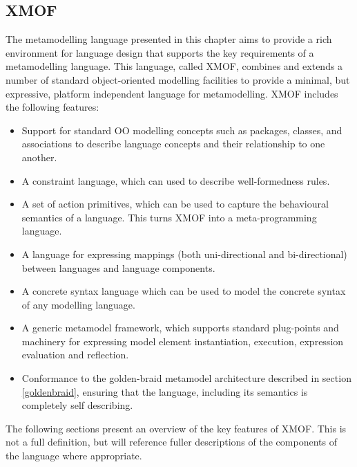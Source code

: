 \subsection{XMOF}

The metamodelling language presented in this chapter aims to
provide a rich environment for language design that supports the
key requirements of a metamodelling language. This language,
called XMOF, combines and extends a number of standard
object-oriented modelling facilities to provide a minimal, but
expressive, platform independent language for metamodelling. XMOF
includes the following features:

\begin{itemize}

\item Support for standard OO modelling concepts such as packages, classes, and
associations to describe language concepts and their relationship to one another.

\item A constraint language, which can used to describe well-formedness rules.

\item A set of action primitives, which can be used to capture the behavioural
semantics of a language. This turns XMOF into a meta-programming
language.

\item A language for expressing mappings (both uni-directional and bi-directional)
between languages and language components.

\item A concrete syntax language which can be used to model the concrete syntax of
any modelling language.

\item A generic metamodel framework, which supports standard plug-points and machinery for
expressing model element instantiation, execution, expression evaluation and reflection.

\item Conformance to the golden-braid metamodel architecture
described in section \ref{goldenbraid}, ensuring that the
language, including its semantics is completely self describing.

\end{itemize}

The following sections present an overview of the key features of
XMOF. This is not a full definition, but will reference fuller
descriptions of the components of the language where appropriate.

